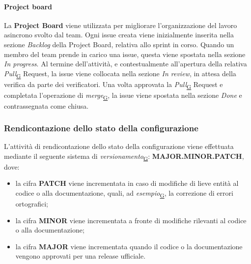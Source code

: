 \documentclass[a4paper,12pt]{article}
\begin{document}
            \paragraph{Project board}\hfill\break
                La \textbf{Project Board} viene utilizzata per migliorare l'organizzazione del lavoro asincrono svolto dal team. Ogni issue creata viene inizialmente inserita nella sezione \textit{Backlog} della Project Board, relativa allo sprint in corso. Quando un membro del team prende in carico una issue, questa viene spostata nella sezione \textit{In progress}. Al termine dell'attività, e contestualmente all'apertura della relativa \textit{Pull}\textsubscript{\href{https://atlasteam9.github.io/Atlas/glossario.html\#Pull}{G}} Request, la issue viene collocata nella sezione \textit{In review}, in attesa della verifica da parte dei verificatori. Una volta approvata la \textit{Pull}\textsubscript{\href{https://atlasteam9.github.io/Atlas/glossario.html\#Pull}{G}} Request e completata l'operazione di \textit{merge}\textsubscript{\href{https://atlasteam9.github.io/Atlas/glossario.html\#Merge}{G}}, la issue viene spostata nella sezione \textit{Done} e contrassegnata come chiusa.
            
        

        \subsubsection{Rendicontazione dello stato della configurazione}
            L'attività di rendicontazione dello stato della configurazione viene effettuata mediante il seguente sistema di \textit{versionamento}\textsubscript{\href{https://atlasteam9.github.io/Atlas/glossario.html\#Versionamento}{G}}: \textbf{MAJOR.MINOR.PATCH}, dove:
            \begin{itemize}
                \item la cifra \textbf{PATCH} viene incrementata in caso di modifiche di lieve entità al codice o alla documentazione, quali, ad \textit{esempio}\textsubscript{\href{https://atlasteam9.github.io/Atlas/glossario.html\#Esempio}{G}}, la correzione di errori ortografici;
                \item la cifra \textbf{MINOR} viene incrementata a fronte di modifiche rilevanti al codice o alla documentazione;
                \item la cifra \textbf{MAJOR} viene incrementata quando il codice o la documentazione vengono approvati per una release ufficiale.
            \end{itemize}
            
\end{document}
